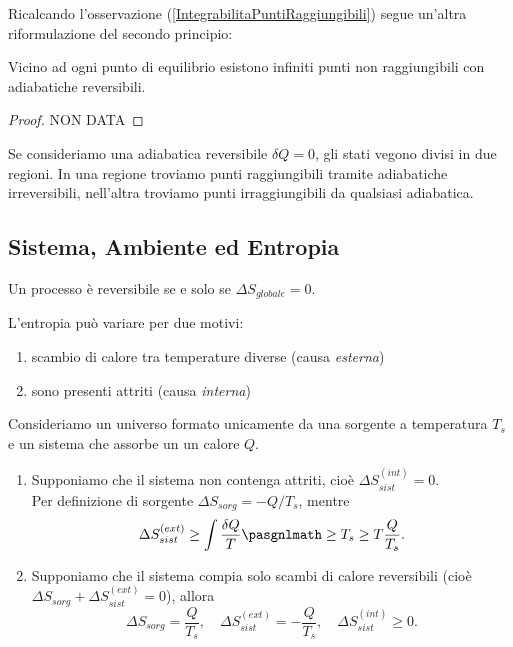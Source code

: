 \noindent
Ricalcando l'osservazione (\ref{IntegrabilitaPuntiRaggiungibili}) segue un'altra riformulazione del secondo principio:
\begin{proposition}\label{SecondoPrincipioCaratheodory}
Vicino ad ogni punto di equilibrio esistono infiniti punti non raggiungibili con adiabatiche reversibili.
\end{proposition}
\begin{proof}
NON DATA
\end{proof}

\begin{remark}
Se consideriamo una adiabatica reversibile $\delta Q=0$, gli stati vegono divisi in due regioni. In una regione troviamo punti raggiungibili tramite adiabatiche irreversibili, nell'altra troviamo punti irraggiungibili da qualsiasi adiabatica.
\end{remark}


\subsection{Sistema, Ambiente ed Entropia}

\begin{remark}
Un processo \`e reversibile se e solo se $\Delta S_{globale}=0$.
\end{remark}

\noindent
L'entropia pu\`o variare per due motivi: 
\begin{enumerate}
\item scambio di calore tra temperature diverse (causa \textit{esterna})
\item sono presenti attriti (causa \textit{interna})
\end{enumerate}

\begin{example}
Consideriamo un universo formato unicamente da una sorgente a temperatura $T_s$ e un sistema che assorbe un un calore $Q$.
\begin{enumerate}
\item Supponiamo che il sistema non contenga attriti, cio\`e $\Delta S_{sist}^{(int)}=0$.\\ 
Per definizione di sorgente $\Delta S_{sorg}=-Q/T_s$, mentre
\[\Delta S_{sist}^{(ext)}\geq \int \frac{\delta Q}T\pasgnlmath\geq{T_s\geq T} \frac Q{T_s}.\]
\item Supponiamo che il sistema compia solo scambi di calore reversibili (cio\`e $\Delta S_{sorg}+\Delta S_{sist}^{(ext)}=0$), allora
\[\Delta S_{sorg}=\frac Q{T_s},\quad \Delta S_{sist}^{(ext)}=-\frac Q{T_s},\quad \Delta S_{sist}^{(int)}\geq 0.\]
\end{enumerate}
\end{example}


